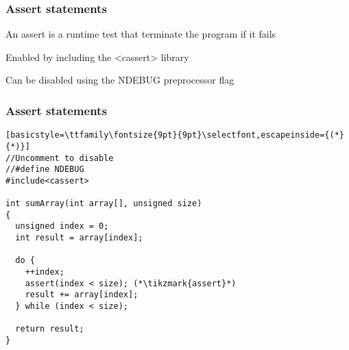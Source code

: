 \documentclass[14pt,a4paper,dvipsnames,usenames]{beamer}
\begin{document}
\begin{frame}[fragile]
  \frametitle{Assert statements}

  An {\color{Tropiteal}assert} is a runtime test that terminate the program if it fails

  \vspace{1em}
  Enabled by including the {\ttfamily\color{sorange}<cassert>} library

  \vspace{1em}
  Can be disabled using the {\ttfamily\color{sorange}NDEBUG} preprocessor flag\\

  \vspace{.5em}

  
\end{frame}

\begin{frame}[fragile]
  \frametitle{Assert statements}

  \begin{lstlisting}[basicstyle=\ttfamily\fontsize{9pt}{9pt}\selectfont,escapeinside={(*}{*)}]
//Uncomment to disable
//#define NDEBUG
#include<cassert>

int sumArray(int array[], unsigned size)
{
  unsigned index = 0;
  int result = array[index];

  do {
    ++index;
    assert(index < size); (*\tikzmark{assert}*)
    result += array[index];
  } while (index < size);

  return result;
}
  \end{lstlisting}

  \nointerlineskip
  
\end{frame}
\end{document}
